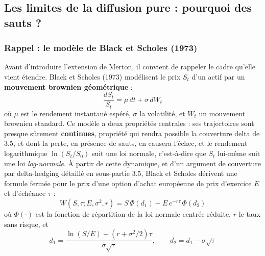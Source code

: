 \documentclass{article}
\begin{document}
\subsection{Les limites de la diffusion pure : pourquoi des sauts ?}
\subsubsection*{Rappel : le modèle de Black et Scholes (1973)}
Avant d'introduire l'extension de Merton, il convient de rappeler le cadre qu'elle vient étendre. Black et Scholes (1973) modélisent le prix $S_t$ d'un actif par un \textbf{mouvement brownien géométrique} :
\begin{equation}
\frac{dS_t}{S_t} = \mu\, dt + \sigma\, dW_t
\end{equation}
où $\mu$ est le rendement instantané espéré, $\sigma$ la volatilité, et $W_t$ un mouvement brownien standard. Ce modèle a deux propriétés centrales : ses trajectoires sont presque sûrement \textbf{continues}, propriété qui rendra possible la couverture delta de 3.5, et dont la perte, en présence de sauts, en causera l'échec, et le rendement logarithmique $\ln(S_t/S_0)$ suit une loi normale, c'est-à-dire que $S_t$ lui-même suit une loi \emph{log-normale}. 
À partir de cette dynamique, et d'un argument de couverture par delta-hedging détaillé en sous-partie 3.5, Black et Scholes dérivent une formule fermée pour le prix d'une option d'achat européenne de prix d'exercice $E$ et d'échéance $\tau$ :
\begin{equation}
W(S,\tau; E, \sigma^2, r) = S\,\Phi(d_1) - E\, e^{-r\tau}\, \Phi(d_2)
\label{eq:bs}
\end{equation}
où $\Phi(\cdot)$ est la fonction de répartition de la loi normale centrée réduite, $r$ le taux sans risque, et
\begin{equation}
d_1 = \frac{\ln(S/E) + (r+\sigma^2/2)\tau}{\sigma\sqrt{\tau}}, \qquad d_2 = d_1 - \sigma\sqrt{\tau}
\end{equation}
\end{document}
